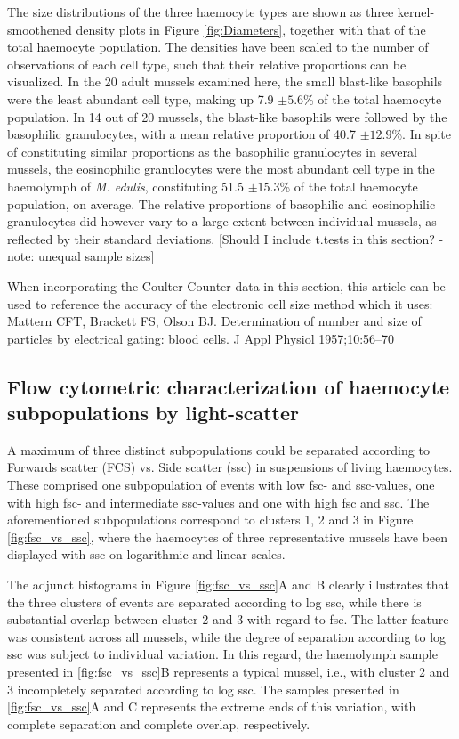 The size distributions of the three haemocyte types are shown as three kernel-smoothened density plots in Figure \ref{fig:Diameters}, together with that of the total haemocyte population. The densities have been scaled to the number of observations of each cell type, such that their relative proportions can be visualized. In the 20 adult mussels examined here, the small blast-like basophils were the least abundant cell type, making up 7.9 $\pm{5.6}$\% of the total haemocyte population. In 14 out of 20 mussels, the blast-like basophils were followed by the basophilic granulocytes, with a mean relative proportion of 40.7 $\pm{12.9}$\%. In spite of constituting similar proportions as the basophilic granulocytes in several mussels, the eosinophilic granulocytes were the most abundant cell type in the haemolymph of \emph{M. edulis}, constituting 51.5 $\pm{15.3}$\% of the total haemocyte population, on average. The relative proportions of basophilic and eosinophilic granulocytes did however vary to a large extent between individual mussels, as reflected by their standard deviations. [Should I include t.tests in this section? - note: unequal sample sizes]

When incorporating the Coulter Counter data in this section, this article can be used to reference the accuracy of the electronic cell size method which it uses: Mattern CFT, Brackett FS, Olson BJ. Determination of number and size of particles by electrical gating: blood cells. J Appl Physiol 1957;10:56–70


\subsection{Flow cytometric characterization of haemocyte subpopulations by light-scatter}
\label{subsection:Results_FlowChar}
A maximum of three distinct subpopulations could be separated according to Forwards scatter (FCS) vs. Side scatter (\acrshort{ssc}) in suspensions of living haemocytes. These comprised one subpopulation of events with low \acrshort{fsc}- and \acrshort{ssc}-values, one with high \acrshort{fsc}- and intermediate \acrshort{ssc}-values and one with high \acrshort{fsc} and \acrshort{ssc}. The aforementioned subpopulations correspond to clusters 1, 2 and 3 in Figure \ref{fig:fsc_vs_ssc}, where the haemocytes of three representative mussels have been displayed with \acrshort{ssc} on logarithmic and linear scales.

The adjunct histograms in Figure \ref{fig:fsc_vs_ssc}A and B clearly illustrates that the three clusters of events are separated according to log \acrshort{ssc}, while there is substantial overlap between cluster 2 and 3 with regard to \acrshort{fsc}. The latter feature was consistent across all mussels, while the degree of separation according to log \acrshort{ssc} was subject to individual variation. In this regard, the haemolymph sample presented in \ref{fig:fsc_vs_ssc}B represents a typical mussel, i.e., with cluster 2 and 3 incompletely separated according to log \acrshort{ssc}. The samples presented in \ref{fig:fsc_vs_ssc}A and C represents the extreme ends of this variation, with complete separation and complete overlap, respectively.


